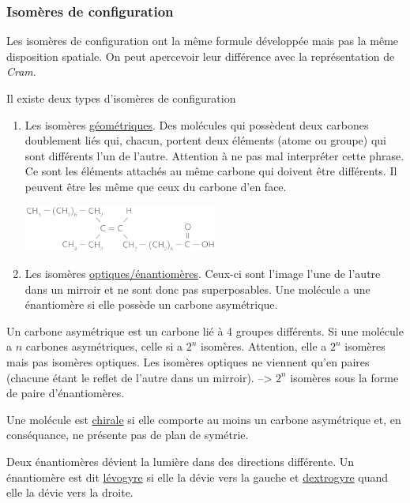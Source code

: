 \documentclass[a4paper]{article}
\begin{document}
    \subsubsection{Isomères de configuration}
    Les isomères de configuration ont la même formule développée mais pas la
    même disposition spatiale. On peut apercevoir leur différence avec la
    représentation de \textit{Cram}.

    Il existe deux types d'isomères de configuration
    \begin{enumerate}
        \item Les isomères \underline{géométriques}. Des molécules qui possèdent
        deux carbones doublement liés qui, chacun, portent deux éléments 
        (atome ou groupe) qui sont différents l'un de l'autre. Attention à ne
        pas mal interpréter cette phrase. Ce sont les éléments attachés au même
        carbone qui doivent être différents. Il peuvent être les même que ceux
        du carbone d'en face.
        \newline
        \begin{center}
        \includegraphics[width=0.5\textwidth]{figs/isomere_geometrique_synthese_chimie_sem1.png}
        \end{center}
        \item Les isomères \underline{optiques/énantiomères}. Ceux-ci sont
        l'image l'une de l'autre dans un mirroir et ne sont donc pas
        superposables. Une molécule a une énantiomère si elle possède un carbone
        asymétrique.
        \end{enumerate}

        Un carbone asymétrique est un carbone lié à 4 groupes différents. Si une
        molécule a $n$ carbones asymétriques, celle si a $2^n$ isomères.
        Attention, elle a $2^n$ isomères mais pas isomères optiques. Les
        isomères optiques ne viennent qu'en paires (chacune étant le reflet
        de l'autre dans un mirroir). --> $2^n$ isomères sous la forme de paire
        d'énantiomères.
       
        Une molécule est \underline{chirale} si elle comporte au moins un
        carbone asymétrique et, en conséquance, ne présente pas de plan de
        symétrie.

        Deux énantiomères dévient la lumière dans des directions différente.
        Un énantiomère est dit \underline{lévogyre} si elle la dévie vers la
        gauche et \underline{dextrogyre} quand elle la dévie vers la droite.
\end{document}
